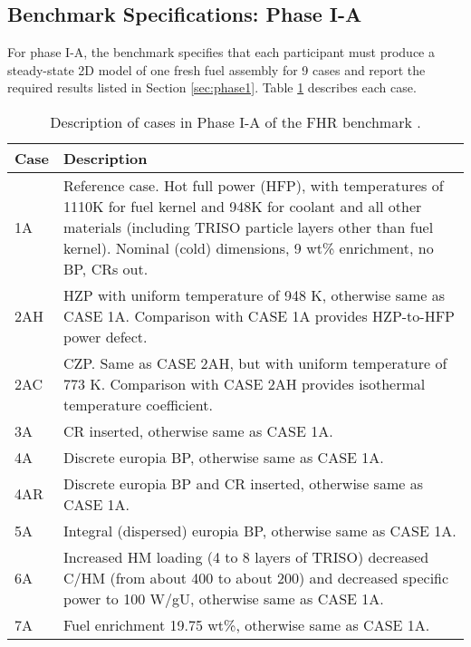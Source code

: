 \subsection{Benchmark Specifications: Phase I-A}
For phase I-A, the benchmark specifies that each participant must produce a 
steady-state 2D model of one fresh fuel assembly for 9 cases
and report the required results listed in Section \ref{sec:phase1}.  
Table \ref{tab:phase1a-cases} describes each case. 
\begin{table}[H]
    \centering
    \onehalfspacing
    \caption{Description of cases in Phase I-A of the \gls{FHR} benchmark \cite{noauthor_fluoride_nodate}.}
	\label{tab:phase1a-cases}
    \footnotesize
    \begin{tabular}{p{}|p{}}
    \hline 
    \textbf{Case} & \textbf{Description} \\
    \hline
    1A & Reference case. Hot full power (HFP), with temperatures of 1110K for 
    fuel kernel and 948K for coolant and all other materials (including TRISO 
    particle layers other than fuel kernel). Nominal (cold) dimensions, 
    9 wt\% enrichment, no \gls{BP}, \glspl{CR} out.\\
    \hline
    2AH & \Gls{HZP} with uniform temperature of 948 K, 
    otherwise same as CASE 1A. Comparison with CASE 1A provides HZP-to-HFP power 
    defect.\\
    \hline 
    2AC & \Gls{CZP}. Same as CASE 2AH, but with uniform temperature 
    of 773 K. Comparison with CASE 2AH provides isothermal temperature coefficient.\\
    \hline
    3A & \gls{CR} inserted, otherwise same as CASE 1A. \\
    \hline
    4A & Discrete europia \gls{BP}, otherwise same as CASE 1A.\\
    \hline
    4AR & Discrete europia \gls{BP} and \gls{CR} inserted, otherwise same as 
    CASE 1A. \\
    \hline
    5A & Integral (dispersed) europia \gls{BP}, otherwise same as CASE 1A. \\
    \hline
    6A & Increased \gls{HM} loading (4 to 8 layers of \gls{TRISO}) decreased C/HM 
    (from about 400 to about 200) and decreased specific power to 100 W/gU, 
    otherwise same as CASE 1A.\\
    \hline 
    7A & Fuel enrichment 19.75 wt\%, otherwise same as CASE 1A.\\
    \hline 
    \end{tabular}
\end{table}

